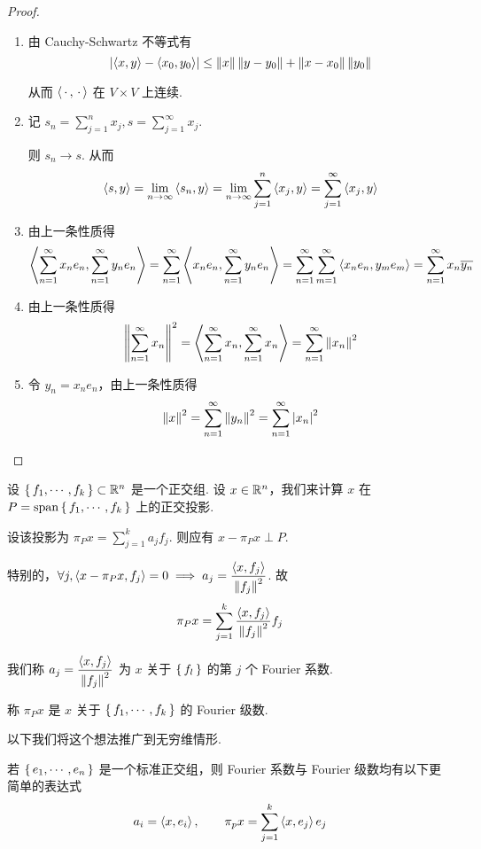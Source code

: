 \begin{proof}
    \begin{enumerate}
        \item 由 Cauchy-Schwartz 不等式有
$$
\left\lvert{\left\langle{x,y}\right\rangle-\left\langle{x_0,y_0}\right\rangle}\right\rvert\le\left\lVert{x}\right\rVert\left\lVert{y-y_0}\right\rVert+\left\lVert{x-x_0}\right\rVert\left\lVert{y_0}\right\rVert
$$

        从而 $\left\langle{\,\cdot\,,\,\cdot\,}\right\rangle$ 在 $V\times V$ 上连续.

        \item 记 $s_n=\sum\limits_{j=1}^nx_j,s=\sum\limits_{j=1}^\infty x_j$.
        
        则 $s_n\to s$. 从而
$$
\left\langle{s,y}\right\rangle=\lim_{n\to\infty}\left\langle{s_n,y}\right\rangle=\lim_{n\to\infty}\sum_{j=1}^n\left\langle{x_j,y}\right\rangle=\sum_{j=1}^\infty\left\langle{x_j,y}\right\rangle
$$

        \item 由上一条性质得
$$
\left\langle{\sum_{n=1}^\infty x_ne_n,\sum_{n=1}^\infty y_ne_n}\right\rangle=\sum_{n=1}^\infty\left\langle{x_ne_n,\sum_{n=1}^\infty y_ne_n}\right\rangle=\sum_{n=1}^\infty\sum_{m=1}^\infty\left\langle{x_ne_n,y_me_m}\right\rangle=\sum_{n=1}^\infty x_n\overline{y_n}
$$
        
        \item 由上一条性质得
$$
\left\lVert{\sum_{n=1}^\infty x_n}\right\rVert^2=\left\langle{\sum_{n=1}^\infty x_n,\sum_{n=1}^\infty x_n}\right\rangle=\sum_{n=1}^\infty\left\lVert{x_n}\right\rVert^2
$$

        \item 令 $y_n=x_ne_n$，由上一条性质得
$$
\left\lVert{x}\right\rVert^2=\sum_{n=1}^\infty\left\lVert{y_n}\right\rVert^2=\sum_{n=1}^\infty\left\lvert{x_n}\right\rvert^2
$$
    \end{enumerate}
\end{proof}


设 $\set{f_1,\cdots,f_k}\subset\mathbb{R}^n$ 是一个正交组. 设 $x\in\mathbb{R}^n$，我们来计算 $x$ 在 $P=\mathrm{span}\set{f_1,\cdots,f_k}$ 上的正交投影.

设该投影为 $\pi_Px=\sum\limits_{j=1}^ka_jf_j$. 则应有 $x-\pi_Px\perp P$.

特别的，$\forall j,\left\langle{x-\pi_Px,f_j}\right\rangle=0\implies a_j=\dfrac{\left\langle{x,f_j}\right\rangle}{\left\lVert{f_j}\right\rVert^2}$. 故
$$
\pi_Px=\sum_{j=1}^k\frac{\left\langle{x,f_j}\right\rangle}{\left\lVert{f_j}\right\rVert^2}f_j
$$

我们称 $a_j=\dfrac{\left\langle{x,f_j}\right\rangle}{\left\lVert{f_j}\right\rVert^2}$ 为 $x$ 关于 $\set{f_l}$ 的第 $j$ 个 Fourier 系数.

称 $\pi_Px$ 是 $x$ 关于 $\set{f_1,\cdots,f_k}$ 的 Fourier 级数.

以下我们将这个想法推广到无穷维情形.

\begin{hint}
    若 $\set{e_1,\cdots,e_n}$ 是一个标准正交组，则 Fourier 系数与 Fourier 级数均有以下更简单的表达式
$$
a_i=\left\langle{x,e_i}\right\rangle,\qquad\pi_px=\sum_{j=1}^k\left\langle{x,e_j}\right\rangle e_j
$$
\end{hint}

